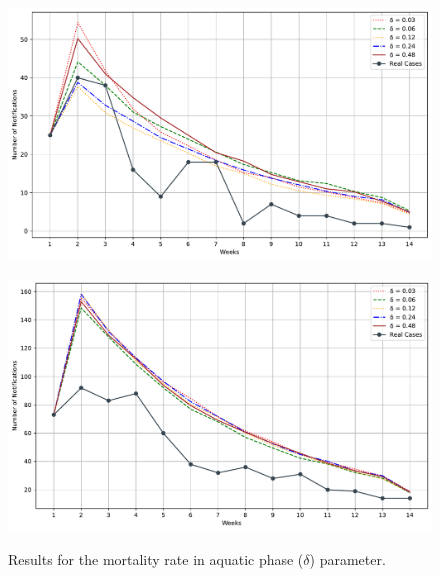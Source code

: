 \begin{figure}[h!]
    \begin{minipage}[c]{.45\textwidth}
      \centering
      \includegraphics[scale=0.3]{images/parameters-experiments/AS_2017-01-15_bs_aquatic_phase_mortality_rate.pdf} \\
    \end{minipage}
    \hspace{0.5cm}
    \begin{minipage}[c]{.45\textwidth}
        \centering
        \includegraphics[scale=0.3]{images/parameters-experiments/LN_2020-07-19_bs_aquatic_phase_mortality_rate.pdf} \\
    \end{minipage}
    \caption{\label{fig:sensitivity-analysis-delta} Results for the mortality rate in aquatic phase ($\delta$) parameter.}
\end{figure}

